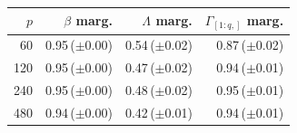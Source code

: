 
\begin{tabular}{rrrr}
\toprule
$p$ & $\beta$ marg. & $\Lambda$ marg. & $\Gamma_{[1:q,]}$ marg.\\
\midrule
60 & 0.95\,($\pm$0.00) & 0.54\,($\pm$0.02) & 0.87\,($\pm$0.02)\\
120 & 0.95\,($\pm$0.00) & 0.47\,($\pm$0.02) & 0.94\,($\pm$0.01)\\
240 & 0.95\,($\pm$0.00) & 0.48\,($\pm$0.02) & 0.95\,($\pm$0.01)\\
480 & 0.94\,($\pm$0.00) & 0.42\,($\pm$0.01) & 0.94\,($\pm$0.01)\\
\bottomrule
\end{tabular}
